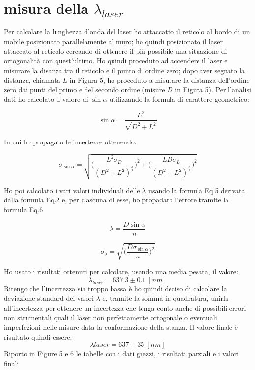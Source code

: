 \documentclass{article}
\begin{document}
\section{misura della $\lambda_{laser}$}
Per calcolare la lunghezza d'onda del laser ho attaccatto il reticolo al bordo di un mobile posizionato parallelamente al muro; ho quindi posizionato il laser attaccato al reticolo cercando di ottenere il più possibile una situazione di ortogonalità con quest'ultimo. Ho quindi proceduto ad accendere il laser e misurare la disanza tra il reticolo e il punto di ordine zero; dopo aver segnato la distanza, chiamata $L$ in Figura 5, ho proceduto a misurare la distanza dell'ordine zero dai punti del primo e del secondo ordine (misure $D$ in Figura 5). Per l'analisi dati ho calcolato il valore di $\sin \alpha$  utilizzando la formula di carattere geometrico:

\begin{equation}
 \sin \alpha =\frac{L^2}{\sqrt{D^2 + L^2}}
\end{equation}

In cui ho propagato le incertezze ottenendo:

\begin{equation}
\sigma_{\sin \alpha} = \sqrt{\bigg( \frac{L^2 \sigma_D}{(D^2 + L^2)^{\frac{3}{2}}} \bigg)^2 + \bigg( \frac{L  D  \sigma_L}{(D^2 + L^2)^{\frac{3}{2}}} \bigg)^2} 
\end{equation}

Ho poi calcolato i vari valori individuali delle $\lambda$ usando la formula Eq.5 derivata dalla formula Eq.2 e, per ciascuna di esse, ho propadato l'errore tramite la formula Eq.6

\begin{equation}
\lambda = \frac{D \sin \alpha}{n}
\end{equation}

\begin{equation}
\sigma_\lambda = \sqrt{\bigg( \frac{D \sigma_{\sin \alpha}}{n} \bigg)^2}
\end{equation}

Ho usato i risultati ottenuti per calcolare, usando una media pesata, il valore:
\[ \lambda_{laser} = 637.3 \pm 0.1 \; [nm] \]
Ritengo che l'incertezza sia troppo bassa è ho quindi deciso di calcolare la deviazione standard dei valori $\lambda$ e, tramite la somma in quadratura, unirla all'incertezza per ottenere un incertezza che tenga conto anche di possibili errori non strumentali quali il laser non perfettamente ortogonale o eventuali imperfezioni nelle misure data la conformazione della stanza. Il valore finale è risultato quindi essere:
\[ \lambda{laser} = 637 \pm 35 \; [nm] \]
Riporto in Figure 5 e 6 le tabelle con i dati grezzi, i risultati parziali e i valori finali
\end{document}
